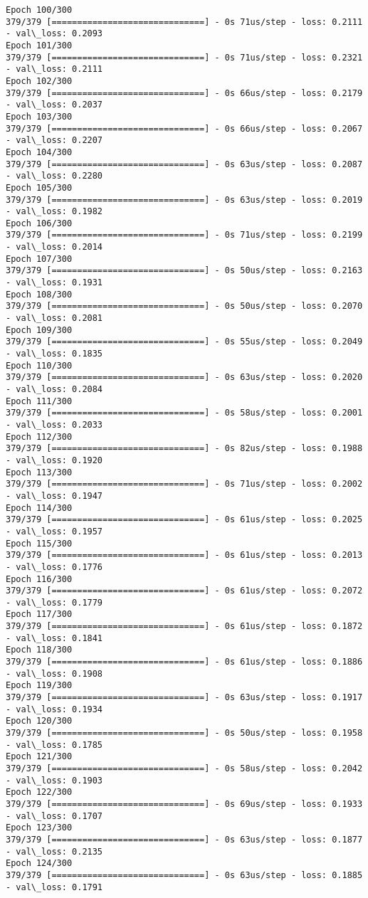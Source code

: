 \documentclass[11pt]{article}
\begin{document}
\begin{Verbatim}[commandchars=\\\{\}]
Epoch 100/300
379/379 [==============================] - 0s 71us/step - loss: 0.2111 - val\_loss: 0.2093
Epoch 101/300
379/379 [==============================] - 0s 71us/step - loss: 0.2321 - val\_loss: 0.2111
Epoch 102/300
379/379 [==============================] - 0s 66us/step - loss: 0.2179 - val\_loss: 0.2037
Epoch 103/300
379/379 [==============================] - 0s 66us/step - loss: 0.2067 - val\_loss: 0.2207
Epoch 104/300
379/379 [==============================] - 0s 63us/step - loss: 0.2087 - val\_loss: 0.2280
Epoch 105/300
379/379 [==============================] - 0s 63us/step - loss: 0.2019 - val\_loss: 0.1982
Epoch 106/300
379/379 [==============================] - 0s 71us/step - loss: 0.2199 - val\_loss: 0.2014
Epoch 107/300
379/379 [==============================] - 0s 50us/step - loss: 0.2163 - val\_loss: 0.1931
Epoch 108/300
379/379 [==============================] - 0s 50us/step - loss: 0.2070 - val\_loss: 0.2081
Epoch 109/300
379/379 [==============================] - 0s 55us/step - loss: 0.2049 - val\_loss: 0.1835
Epoch 110/300
379/379 [==============================] - 0s 63us/step - loss: 0.2020 - val\_loss: 0.2084
Epoch 111/300
379/379 [==============================] - 0s 58us/step - loss: 0.2001 - val\_loss: 0.2033
Epoch 112/300
379/379 [==============================] - 0s 82us/step - loss: 0.1988 - val\_loss: 0.1920
Epoch 113/300
379/379 [==============================] - 0s 71us/step - loss: 0.2002 - val\_loss: 0.1947
Epoch 114/300
379/379 [==============================] - 0s 61us/step - loss: 0.2025 - val\_loss: 0.1957
Epoch 115/300
379/379 [==============================] - 0s 61us/step - loss: 0.2013 - val\_loss: 0.1776
Epoch 116/300
379/379 [==============================] - 0s 61us/step - loss: 0.2072 - val\_loss: 0.1779
Epoch 117/300
379/379 [==============================] - 0s 61us/step - loss: 0.1872 - val\_loss: 0.1841
Epoch 118/300
379/379 [==============================] - 0s 61us/step - loss: 0.1886 - val\_loss: 0.1908
Epoch 119/300
379/379 [==============================] - 0s 63us/step - loss: 0.1917 - val\_loss: 0.1934
Epoch 120/300
379/379 [==============================] - 0s 50us/step - loss: 0.1958 - val\_loss: 0.1785
Epoch 121/300
379/379 [==============================] - 0s 58us/step - loss: 0.2042 - val\_loss: 0.1903
Epoch 122/300
379/379 [==============================] - 0s 69us/step - loss: 0.1933 - val\_loss: 0.1707
Epoch 123/300
379/379 [==============================] - 0s 63us/step - loss: 0.1877 - val\_loss: 0.2135
Epoch 124/300
379/379 [==============================] - 0s 63us/step - loss: 0.1885 - val\_loss: 0.1791

\end{Verbatim}
\end{document}
